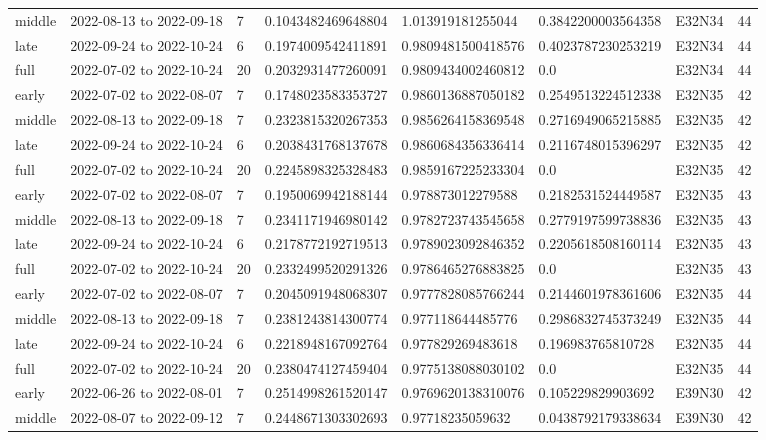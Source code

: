 \begin{longtable}{llllllll}
middle & 2022-08-13 to 2022-09-18 & 7 & 0.1043482469648804 & 1.013919181255044 & 0.3842200003564358 & E32N34 & 44 \\
late & 2022-09-24 to 2022-10-24 & 6 & 0.1974009542411891 & 0.9809481500418576 & 0.4023787230253219 & E32N34 & 44 \\
full & 2022-07-02 to 2022-10-24 & 20 & 0.2032931477260091 & 0.9809434002460812 & 0.0 & E32N34 & 44 \\
early & 2022-07-02 to 2022-08-07 & 7 & 0.1748023583353727 & 0.9860136887050182 & 0.2549513224512338 & E32N35 & 42 \\
middle & 2022-08-13 to 2022-09-18 & 7 & 0.2323815320267353 & 0.9856264158369548 & 0.2716949065215885 & E32N35 & 42 \\
late & 2022-09-24 to 2022-10-24 & 6 & 0.2038431768137678 & 0.9860684356336414 & 0.2116748015396297 & E32N35 & 42 \\
full & 2022-07-02 to 2022-10-24 & 20 & 0.2245898325328483 & 0.9859167225233304 & 0.0 & E32N35 & 42 \\
early & 2022-07-02 to 2022-08-07 & 7 & 0.1950069942188144 & 0.978873012279588 & 0.2182531524449587 & E32N35 & 43 \\
middle & 2022-08-13 to 2022-09-18 & 7 & 0.2341171946980142 & 0.9782723743545658 & 0.2779197599738836 & E32N35 & 43 \\
late & 2022-09-24 to 2022-10-24 & 6 & 0.2178772192719513 & 0.9789023092846352 & 0.2205618508160114 & E32N35 & 43 \\
full & 2022-07-02 to 2022-10-24 & 20 & 0.2332499520291326 & 0.9786465276883825 & 0.0 & E32N35 & 43 \\
early & 2022-07-02 to 2022-08-07 & 7 & 0.2045091948068307 & 0.9777828085766244 & 0.2144601978361606 & E32N35 & 44 \\
middle & 2022-08-13 to 2022-09-18 & 7 & 0.2381243814300774 & 0.977118644485776 & 0.2986832745373249 & E32N35 & 44 \\
late & 2022-09-24 to 2022-10-24 & 6 & 0.2218948167092764 & 0.977829269483618 & 0.196983765810728 & E32N35 & 44 \\
full & 2022-07-02 to 2022-10-24 & 20 & 0.2380474127459404 & 0.9775138088030102 & 0.0 & E32N35 & 44 \\
early & 2022-06-26 to 2022-08-01 & 7 & 0.2514998261520147 & 0.9769620138310076 & 0.105229829903692 & E39N30 & 42 \\
middle & 2022-08-07 to 2022-09-12 & 7 & 0.2448671303302693 & 0.97718235059632 & 0.0438792179338634 & E39N30 & 42 \\

\end{longtable}
